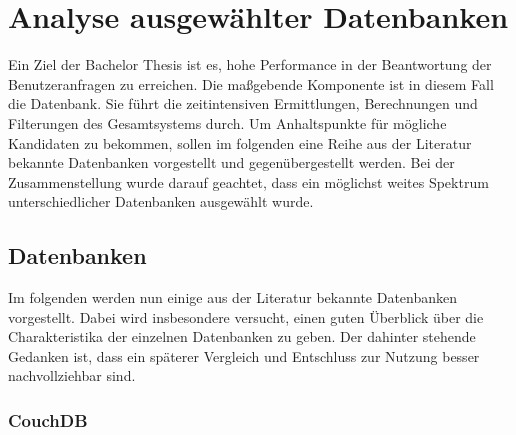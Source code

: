 \chapter{Analyse ausgewählter Datenbanken}
\label{ch:AnalyseDatenbanken}

Ein Ziel der Bachelor Thesis ist es, hohe Performance in der Beantwortung der Benutzeranfragen zu erreichen. Die maßgebende Komponente ist in diesem Fall die Datenbank. Sie führt die zeitintensiven Ermittlungen, Berechnungen und Filterungen des Gesamtsystems durch. Um Anhaltspunkte für mögliche Kandidaten zu bekommen, sollen im folgenden eine Reihe aus der Literatur bekannte Datenbanken vorgestellt und gegenübergestellt werden. Bei der Zusammenstellung wurde darauf geachtet, dass ein möglichst weites Spektrum unterschiedlicher Datenbanken ausgewählt wurde.

\section{Datenbanken}
\label{ch:AnalyseDatenbanken}

Im folgenden werden nun einige aus der Literatur bekannte Datenbanken vorgestellt. Dabei wird insbesondere versucht, einen guten Überblick über die Charakteristika der einzelnen Datenbanken zu geben. Der dahinter stehende Gedanken ist, dass ein späterer Vergleich und Entschluss zur Nutzung besser nachvollziehbar sind. 

\subsection{CouchDB}


